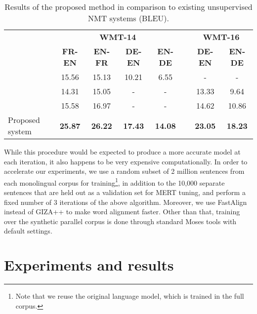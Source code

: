 \documentclass[11pt,a4paper]{article}
\begin{document}
\begin{table*}[t]
\begin{center}
  \begin{tabular}{lccccccc}
    \toprule
    & \multicolumn{4}{c}{\bf WMT-14} & & \multicolumn{2}{c}{\bf WMT-16} \\
    \cmidrule{2-5} \cmidrule{7-8}
    & \multicolumn{1}{c}{\bf FR-EN} & \multicolumn{1}{c}{\bf EN-FR} & \multicolumn{1}{c}{\bf DE-EN} & \multicolumn{1}{c}{\bf EN-DE} & & \multicolumn{1}{c}{\bf DE-EN} & \multicolumn{1}{c}{\bf EN-DE} \\
    \midrule
    \citet{artetxe2018unsupervised} & 15.56 & 15.13 & 10.21 & 6.55 & & - & - \\
    \citet{lample2018unsupervised} & 14.31 & 15.05 & - & - & & 13.33 & 9.64 \\
    \citet{yang2018unsupervised} & 15.58 & 16.97 & - & - & & 14.62 & 10.86 \\
    \midrule
    Proposed system & \bf 25.87 & \bf 26.22 & \bf 17.43 & \bf 14.08 & & \bf 23.05 & \bf 18.23 \\
    \bottomrule
  \end{tabular}
\end{center}
\caption{Results of the proposed method in comparison to existing unsupervised NMT systems (BLEU).}
\label{tab:results_sota}
\end{table*}

While this procedure would be expected to produce a more accurate model at each iteration, it also happens to be very expensive computationally. In order to accelerate our experiments, we use a random subset of 2 million sentences from each monolingual corpus for training\footnote{Note that we reuse the original language model, which is trained in the full corpus.}, in addition to the 10,000 separate sentences that are held out as a validation set for MERT tuning, and perform a fixed number of 3 iterations of the above algorithm. Moreover, we use FastAlign \citep{dyer2013simple} instead of GIZA++ to make word alignment faster. Other than that, training over the synthetic parallel corpus is done through standard Moses tools with default settings.


\section{Experiments and results} \label{sec:experiments}
\end{document}
